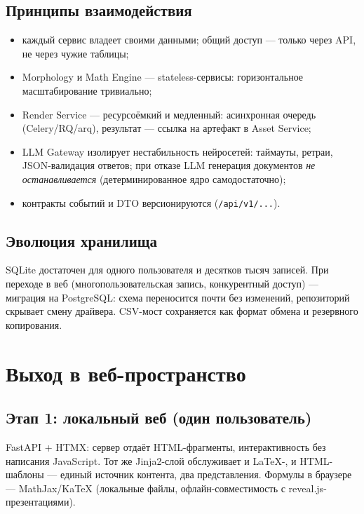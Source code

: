 \documentclass[12pt,a4paper]{article}
\begin{document}
\subsection{Принципы взаимодействия}
\begin{itemize}
  \item каждый сервис владеет своими данными; общий доступ --- только через API, не через чужие таблицы;
  \item Morphology и Math Engine --- stateless-сервисы: горизонтальное масштабирование тривиально;
  \item Render Service --- ресурсоёмкий и медленный: асинхронная очередь (Celery/RQ/arq), результат --- ссылка на артефакт в Asset Service;
  \item LLM Gateway изолирует нестабильность нейросетей: таймауты, ретраи, JSON-валидация ответов; при отказе LLM генерация документов \emph{не останавливается} (детерминированное ядро самодостаточно);
  \item контракты событий и DTO версионируются (\texttt{/api/v1/...}).
\end{itemize}

\subsection{Эволюция хранилища}
SQLite достаточен для одного пользователя и десятков тысяч записей. При переходе в веб (многопользовательская запись, конкурентный доступ) --- миграция на PostgreSQL: схема переносится почти без изменений, репозиторий скрывает смену драйвера. CSV-мост сохраняется как формат обмена и резервного копирования.

\section{Выход в веб-пространство}

\subsection{Этап 1: локальный веб (один пользователь)}
FastAPI + HTMX: сервер отдаёт HTML-фрагменты, интерактивность без написания JavaScript. Тот же Jinja2-слой обслуживает и LaTeX-, и HTML-шаблоны --- единый источник контента, два представления. Формулы в браузере --- MathJax/KaTeX (локальные файлы, офлайн-совместимость с reveal.js-презентациями).
\end{document}
